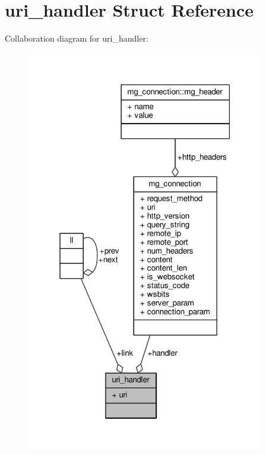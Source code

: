 \hypertarget{structuri__handler}{}\section{uri\+\_\+handler Struct Reference}
\label{structuri__handler}


Collaboration diagram for uri\+\_\+handler\+:
\nopagebreak
\begin{figure}[H]
\begin{center}
\leavevmode
\includegraphics[width=294pt]{de/de0/structuri__handler__coll__graph}
\end{center}
\end{figure}
